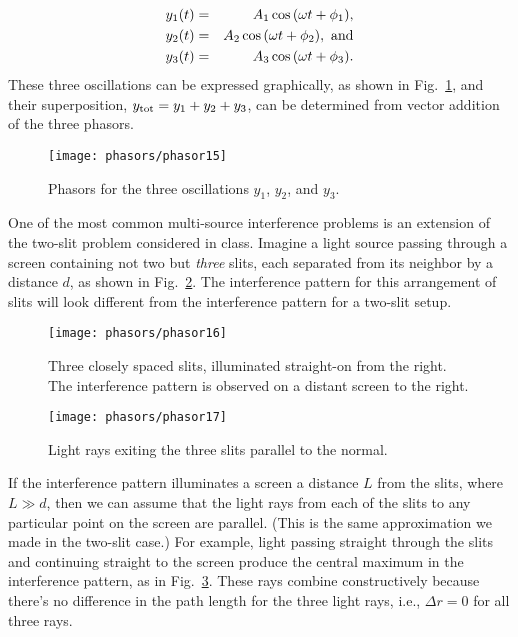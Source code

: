 \begin{eqnarray*}
y_1(t) & = & A_1\cos{(\omega t + \phi_1)}, \\
y_2(t) & = & A_2\cos{(\omega t + \phi_2)}, \ {\rm and} \\
y_3(t) & = & A_3\cos{(\omega t + \phi_3)}.
\end{eqnarray*}
These three oscillations can be expressed graphically, as shown in 
Fig.~\ref{fig:phasor15},
 and their superposition, $y_{\rm tot} = y_1 + y_2 + y_3$, can
be determined from vector addition of the three phasors.


\begin{figure}\begin{center}
 \texttt{[image: phasors/phasor15]} 
\caption{\label{fig:phasor15}Phasors for the three oscillations $y_1$, $y_2$, 
and $y_3$.}
\end{center}
\end{figure}

One of the most common multi-source interference problems is an
extension of the two-slit problem considered in class. Imagine a light
source passing through a screen containing not two but {\em three}
slits, each separated from its neighbor by a distance $d$, as shown
in Fig.~\ref{fig:phasor16}.
 The interference pattern for this arrangement of slits will
look different from the interference pattern for a two-slit setup.


\begin{figure}\begin{center}
 \texttt{[image: phasors/phasor16]} 
\caption{\label{fig:phasor16}Three closely spaced slits, illuminated straight-on
from the right. The interference pattern is observed on a distant screen to the right.}
\end{center}
\end{figure}



\begin{figure}\begin{center}
 \texttt{[image: phasors/phasor17]} 
\caption{\label{fig:phasor17}Light rays exiting the three slits
parallel to the normal.}
\end{center}
\end{figure}


If the interference pattern illuminates a screen a distance $L$ from
the slits, where $L\gg d$, then we can assume that the light rays from
each of the slits to any particular point on the screen are parallel.
(This is the same approximation we made in the two-slit case.) For
example, light passing straight through the slits and continuing
straight to the screen produce the central maximum in the interference
pattern, as in Fig.~\ref{fig:phasor17}.
 These rays combine constructively because there's no
difference in the path length for the three light rays, i.e., $\Delta
r = 0$ for all three rays.

